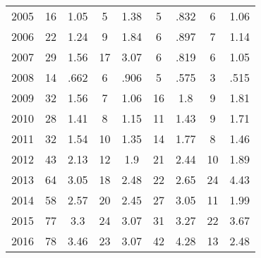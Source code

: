 \begin{table}[htbp]
\begin{tabular}{l*{8}{c}}
2005      &       16&     1.05&        5&     1.38&        5&     .832&        6&     1.06\\
2006      &       22&     1.24&        9&     1.84&        6&     .897&        7&     1.14\\
2007      &       29&     1.56&       17&     3.07&        6&     .819&        6&     1.05\\
2008      &       14&     .662&        6&     .906&        5&     .575&        3&     .515\\
2009      &       32&     1.56&        7&     1.06&       16&      1.8&        9&     1.81\\
2010      &       28&     1.41&        8&     1.15&       11&     1.43&        9&     1.71\\
2011      &       32&     1.54&       10&     1.35&       14&     1.77&        8&     1.46\\
2012      &       43&     2.13&       12&      1.9&       21&     2.44&       10&     1.89\\
2013      &       64&     3.05&       18&     2.48&       22&     2.65&       24&     4.43\\
2014      &       58&     2.57&       20&     2.45&       27&     3.05&       11&     1.99\\
2015      &       77&      3.3&       24&     3.07&       31&     3.27&       22&     3.67\\
2016      &       78&     3.46&       23&     3.07&       42&     4.28&       13&     2.48\\
\hline\hline
\end{tabular}
\end{table}
